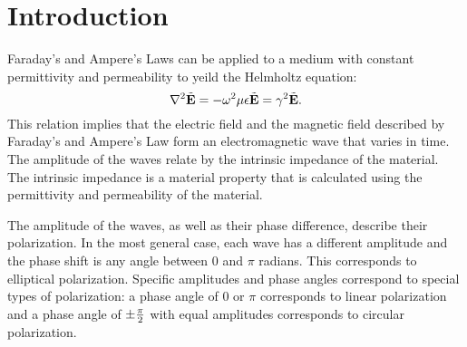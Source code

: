 \section{Introduction}\label{sec:intro}
Faraday's and Ampere's Laws can be applied \cite[pp. 15-16]{lab-manual} to a medium with constant permittivity and permeability to yeild the Helmholtz equation:
\begin{equation}
	\nabla^2 \tilde{\mathbf{E}} = - \omega^2 \mu \epsilon \tilde{\mathbf{E}} = \gamma^2 \tilde{\mathbf{E}}.
\end{equation}
This relation implies that the electric field and the magnetic field described by Faraday's and Ampere's Law form an electromagnetic wave that varies in time.
The amplitude of the waves relate by the intrinsic impedance of the material.
The intrinsic impedance is a material property that is calculated using the permittivity and permeability of the material. 

The amplitude of the waves, as well as their phase difference, describe their polarization.
In the most general case, each wave has a different amplitude and the phase shift is any angle between 0 and $\pi$ radians.
This corresponds to elliptical polarization.
Specific amplitudes and phase angles correspond to special types of polarization: a phase angle of 0 or $\pi$ corresponds to linear polarization and a phase angle of $\pm {\pi \over 2}$ with equal amplitudes corresponds to circular polarization. 
